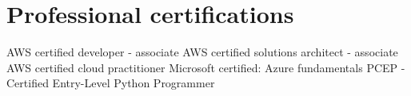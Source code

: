 \section{Professional certifications}
{%
}
{%
	AWS certified developer - associate}
{}
{%
}
{%
	AWS certified solutions architect - associate}
{}
{%
}
{%
	AWS certified cloud practitioner}
{}
{%
}
{%
	Microsoft certified: Azure fundamentals}
{}
{%
}
{%
	PCEP - Certified Entry-Level Python Programmer}
{}
